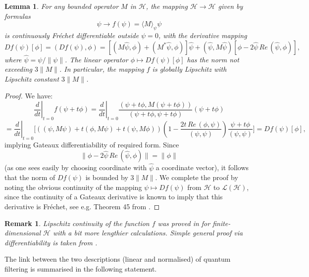 \documentclass[12pt]{article}
\def\LC{\mathcal{L}}
\def\HC{\mathcal{H}}
\newtheorem{lemma}{Lemma}[section]
\newtheorem{remark}{Remark}
\begin{document}
\begin{lemma}
 \label{lemboundder}
 For any bounded operator $M$ in $\HC$, the mapping
 $\HC \to \HC$ given by formulas
 \[
 \psi \to f(\psi)= \langle M \rangle_{\psi} \psi
\]
is continuously Fr\'echet differentiable outside  $\psi= 0$, with the derivative mapping
\[
Df(\psi)[\phi]=(Df(\psi),\phi)
=[(M\hat \psi, \phi)+(M^*\hat \psi, \phi)] \hat \psi
 +(\hat \psi, M\hat \psi)\left[\phi-2\hat \psi \,Re\, (\hat \psi, \phi)\right],
 \]
 where $\hat \psi=\psi/\|\psi\|$. The linear operator $\phi\mapsto Df(\psi)[\phi]$
has the norm not exceeding $3\|M\|$.
In particular, the mapping $f$ is globally Lipschitz with Lipschitz constant $3\|M\|$.
\end{lemma}

\begin{proof}
We have:
\[
\left.\frac{d}{dt}\right|_{t=0} f(\psi+t\phi)
=\left.\frac{d}{dt}\right|_{t=0} \frac{(\psi+t\phi, M(\psi+t\phi))}{(\psi+t\phi, \psi+t\phi)} (\psi+t\phi)
\]
\[
=\left.\frac{d}{dt}\right|_{t=0}\bigl[((\psi,M\psi)+t(\phi, M\psi) +t(\psi, M\phi))
\left(1-\frac{2t \, Re\, (\phi,\psi)}{(\psi,\psi)}\right)\frac{\psi+t\phi}{(\psi,\psi)}\bigr]
=Df(\psi)[\phi],
\]
implying Gateaux differentiability of required form. Since
\[
\|\phi-2\hat \psi \,Re\, (\hat \psi, \phi)\|=\|\phi\|
 \]
(as one sees easily by choosing coordinate  with $\hat \psi$ a coordinate vector),
it follows that the norm of $Df(\psi)$ is bounded by $3\|M\|$. We complete the proof by noting
the obvious continuity of the mapping  $\psi\mapsto Df(\psi)$ from $\HC$ to $\LC(\HC)$,
since the continuity of a Gateaux derivative is known to imply that this derivative is Fr\'echet,
see e.g. Theorem 45 from \cite{Toolbox}.
\end{proof}

\begin{remark} Lipschitz continuity of the function $f$ was proved in \cite{BarchBook}
 for finite-dimensional $\HC$ with a bit more lengthier
calculations. Simple general proof via differentiability is taken from \cite{Kol25a}.
\end{remark}

The link between the two descriptions (linear and normalised) of quantum filtering
is summarised in the following statement.
\end{document}
